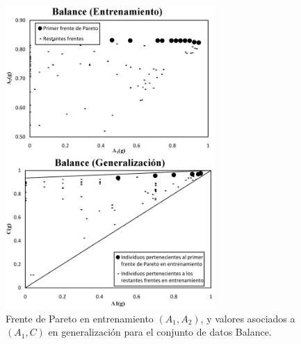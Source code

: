 \begin{figure}[!htb]
\centering
\includegraphics[keepaspectratio, width=8cm]{figuras/ejemploBalanceMPDE.jpg}
\caption{Frente de Pareto en entrenamiento $(A_{1},A_{2})$, y valores asociados a\\
$(A_{1},C)$ en generalización para el conjunto de datos Balance.}
\label{figuraBalance}
\end{figure}
\paginavaciacompleta
%
%
%
%
%
%
%
